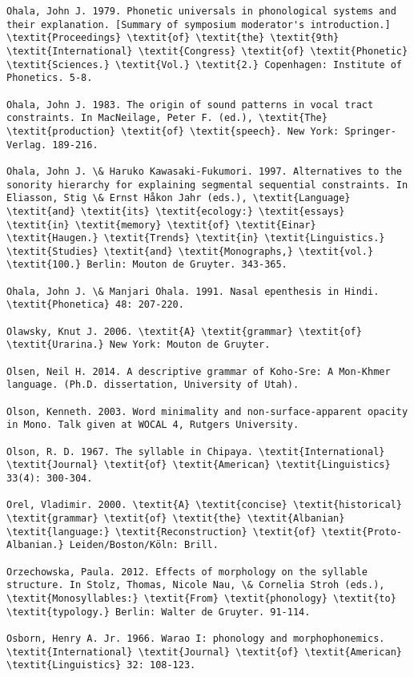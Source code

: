 \begin{verbatim}
Ohala, John J. 1979. Phonetic universals in phonological systems and their explanation. [Summary of symposium moderator's introduction.] \textit{Proceedings} \textit{of} \textit{the} \textit{9th} \textit{International} \textit{Congress} \textit{of} \textit{Phonetic} \textit{Sciences.} \textit{Vol.} \textit{2.} Copenhagen: Institute of Phonetics. 5-8.

Ohala, John J. 1983. The origin of sound patterns in vocal tract constraints. In MacNeilage, Peter F. (ed.), \textit{The} \textit{production} \textit{of} \textit{speech}. New York: Springer-Verlag. 189-216.

Ohala, John J. \& Haruko Kawasaki-Fukumori. 1997. Alternatives to the sonority hierarchy for explaining segmental sequential constraints. In Eliasson, Stig \& Ernst Håkon Jahr (eds.), \textit{Language} \textit{and} \textit{its} \textit{ecology:} \textit{essays} \textit{in} \textit{memory} \textit{of} \textit{Einar} \textit{Haugen.} \textit{Trends} \textit{in} \textit{Linguistics.} \textit{Studies} \textit{and} \textit{Monographs,} \textit{vol.} \textit{100.} Berlin: Mouton de Gruyter. 343-365.

Ohala, John J. \& Manjari Ohala. 1991. Nasal epenthesis in Hindi. \textit{Phonetica} 48: 207-220.

Olawsky, Knut J. 2006. \textit{A} \textit{grammar} \textit{of} \textit{Urarina.} New York: Mouton de Gruyter.

Olsen, Neil H. 2014. A descriptive grammar of Koho-Sre: A Mon-Khmer language. (Ph.D. dissertation, University of Utah).

Olson, Kenneth. 2003. Word minimality and non-surface-apparent opacity in Mono. Talk given at WOCAL 4, Rutgers University.

Olson, R. D. 1967. The syllable in Chipaya. \textit{International} \textit{Journal} \textit{of} \textit{American} \textit{Linguistics} 33(4): 300-304.

Orel, Vladimir. 2000. \textit{A} \textit{concise} \textit{historical} \textit{grammar} \textit{of} \textit{the} \textit{Albanian} \textit{language:} \textit{Reconstruction} \textit{of} \textit{Proto-Albanian.} Leiden/Boston/Köln: Brill.

Orzechowska, Paula. 2012. Effects of morphology on the syllable structure. In Stolz, Thomas, Nicole Nau, \& Cornelia Stroh (eds.), \textit{Monosyllables:} \textit{From} \textit{phonology} \textit{to} \textit{typology.} Berlin: Walter de Gruyter. 91-114.

Osborn, Henry A. Jr. 1966. Warao I: phonology and morphophonemics. \textit{International} \textit{Journal} \textit{of} \textit{American} \textit{Linguistics} 32: 108-123.


\end{verbatim}
